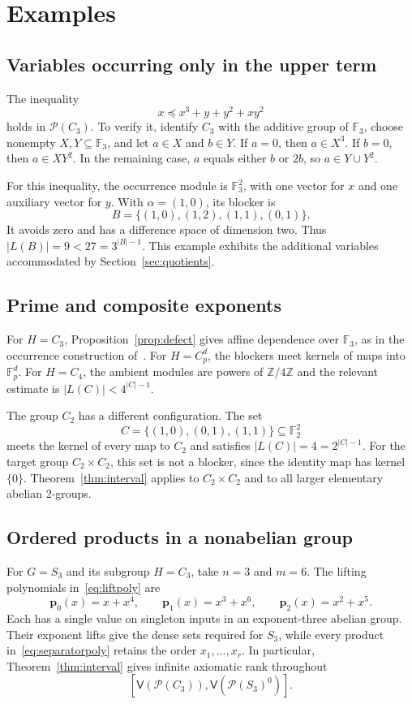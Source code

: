 \documentclass[10pt,a4paper]{amsart}
\numberwithin{equation}{section}
\newcommand{\Pow}{\mathcal{P}}
\newcommand{\Full}[1]{\mathcal{P}(#1)^0}
\newcommand{\Var}{\mathsf{V}}
\newcommand{\Z}{\mathbb{Z}}
\newcommand{\F}{\mathbb{F}}
\newcommand{\bp}{\mathbf{p}}
\begin{document}
\section{Examples}\label{sec:examples}
\subsection{Variables occurring only in the upper term}
The inequality
\begin{equation}\label{eq:auxexample}
 x\preceq x^3+y+y^2+xy^2
\end{equation}
holds in $\Pow(C_3)$. To verify it, identify $C_3$ with the additive group of $\F_3$, choose nonempty $X,Y\subseteq\F_3$, and let $a\in X$ and $b\in Y$. If $a=0$, then $a\in X^3$. If $b=0$, then $a\in XY^2$. In the remaining case, $a$ equals either $b$ or $2b$, so $a\in Y\cup Y^2$.

For this inequality, the occurrence module is $\F_3^2$, with one vector for $x$ and one auxiliary vector for $y$. With $\alpha=(1,0)$, its blocker is
\[
 B=\{(1,0),(1,2),(1,1),(0,1)\}.
\]
It avoids zero and has a difference space of dimension two. Thus $|L(B)|=9<27=3^{|B|-1}$. This example exhibits the additional variables accommodated by Section~\ref{sec:quotients}.

\subsection{Prime and composite exponents}
For $H=C_3$, Proposition~\ref{prop:defect} gives affine dependence over $\F_3$, as in the occurrence construction of~\cite{note}. For $H=C_p^d$, the blockers meet kernels of maps into $\F_p^d$. For $H=C_4$, the ambient modules are powers of $\Z/4\Z$ and the relevant estimate is $|L(C)|<4^{|C|-1}$.

The group $C_2$ has a different configuration. The set
\[
 C=\{(1,0),(0,1),(1,1)\}\subseteq\F_2^2
\]
meets the kernel of every map to $C_2$ and satisfies $|L(C)|=4=2^{|C|-1}$. For the target group $C_2\times C_2$, this set is not a blocker, since the identity map has kernel $\{0\}$. Theorem~\ref{thm:interval} applies to $C_2\times C_2$ and to all larger elementary abelian $2$-groups.

\subsection{Ordered products in a nonabelian group}
For $G=S_3$ and its subgroup $H=C_3$, take $n=3$ and $m=6$. The lifting polynomials in~\eqref{eq:liftpoly} are
\[
 \bp_0(x)=x+x^4,\qquad
 \bp_1(x)=x^3+x^6,\qquad
 \bp_2(x)=x^2+x^5.
\]
Each has a single value on singleton inputs in an exponent-three abelian group. Their exponent lifts give the dense sets required for $S_3$, while every product in~\eqref{eq:separatorpoly} retains the order $x_1,\ldots,x_r$. In particular, Theorem~\ref{thm:interval} gives infinite axiomatic rank throughout
\[
 [\Var(\Pow(C_3)),\Var(\Full{S_3})].
\]
\end{document}
